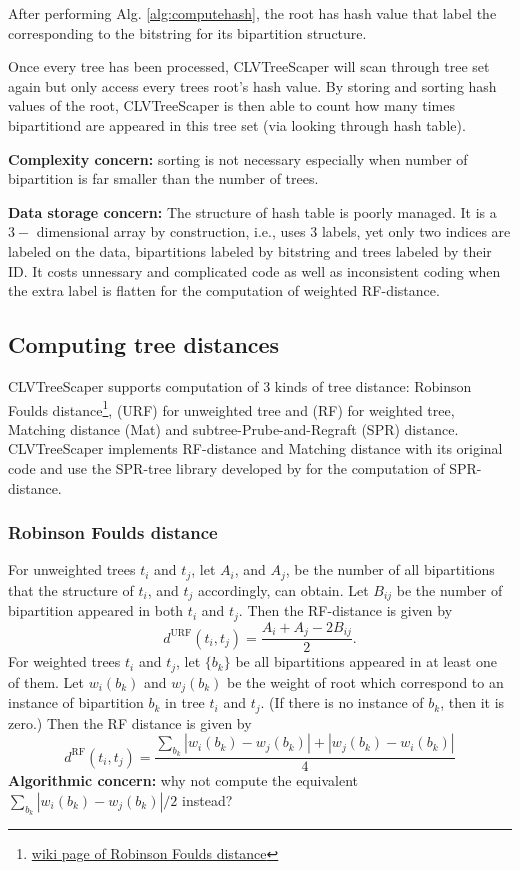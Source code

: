 \documentclass[11pt]{article}
\begin{document}
After performing Alg. \ref{alg:computehash}, the root has hash value that label the corresponding to the bitstring for its bipartition structure.

Once every tree has been processed, CLVTreeScaper will scan through tree set again but only access every trees root's hash value. By storing and sorting hash values of the root, CLVTreeScaper is then able to count how many times bipartitiond are appeared in this tree set (via looking through hash table). 

{\bf Complexity concern:} sorting is not necessary especially when number of bipartition is far smaller than the number of trees.

{\bf Data storage concern:} The structure of hash table is poorly managed. It is a $3-$ dimensional array by construction, i.e., uses $3$ labels, yet only two indices are labeled on the data, bipartitions labeled by bitstring and trees labeled by their ID. It costs unnessary and complicated code as well as inconsistent coding when the extra label is flatten for the computation of weighted RF-distance.



\subsection{Computing tree distances}

CLVTreeScaper supports computation of 3 kinds of tree distance: Robinson Foulds distance\footnote{\href{https://en.wikipedia.org/wiki/Robinson-Foulds_metric}{wiki page of Robinson Foulds distance}}, (URF) for unweighted tree and (RF) for weighted tree, Matching distance (Mat) and subtree-Prube-and-Regraft (SPR) distance. CLVTreeScaper implements RF-distance and Matching distance with its original code and use the SPR-tree library developed by for the computation of SPR-distance.

\subsubsection{Robinson Foulds distance} 

For unweighted trees $t_i$ and $t_j$, let $A_i$, and $A_j$, be the number of all bipartitions that the structure of $t_i$, and $t_j$ accordingly, can obtain. Let $B_{ij}$ be the number of bipartition appeared in both $t_i$ and $t_j$. Then the RF-distance is given by
\begin{equation}\label{eq:URF-distance}
	d^{\text{URF}}(t_i,t_j) = \frac{A_i+A_j- 2B_{ij}}{2}.
\end{equation}
For weighted trees $t_i$ and $t_j$, let $\{b_k\}$ be all bipartitions appeared in at least one of them. Let $w_{i}(b_k)$ and $w_{j}(b_k)$ be the weight of root which correspond to an instance of bipartition $b_k$ in tree $t_i$ and $t_j$. (If there is no instance of $b_k$, then it is zero.) Then the RF distance is given by
\begin{equation}\label{eq:RF-distance}
	d^{\text{RF}}(t_i,t_j) =\frac{\sum_{b_k}|w_i(b_k)-w_j(b_k)| + |w_j(b_k)-w_i(b_k)|}{4}
\end{equation}
{\bf Algorithmic concern:} why not compute the equivalent $\sum_{b_k}|w_i(b_k)-w_j(b_k)|/2$ instead?
\end{document}
